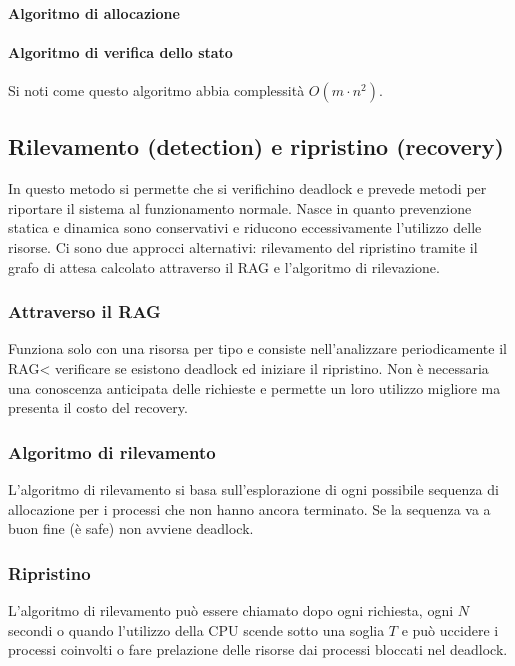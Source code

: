 \paragraph{Algoritmo di allocazione}

\paragraph{Algoritmo di verifica dello stato}

Si noti come questo algoritmo abbia complessit\`a $O(m\cdot n^2)$.
\subsection{Rilevamento (detection) e ripristino (recovery)}
In questo metodo si permette che si verifichino deadlock e prevede metodi per riportare il sistema al funzionamento normale. Nasce in quanto prevenzione statica e dinamica sono 
conservativi e riducono eccessivamente l'utilizzo delle risorse. Ci sono due approcci alternativi: rilevamento del ripristino tramite il grafo di attesa calcolato attraverso il RAG
e l'algoritmo di rilevazione.
\subsubsection{Attraverso il RAG}
Funziona solo con una risorsa per tipo e consiste nell'analizzare periodicamente il RAG< verificare se esistono deadlock ed iniziare il ripristino. Non \`e necessaria una conoscenza
anticipata delle richieste e permette un loro utilizzo migliore ma presenta il costo del recovery. 
\subsubsection{Algoritmo di rilevamento}
L'algoritmo di rilevamento si basa sull'esplorazione di ogni possibile sequenza di allocazione per i processi che non hanno ancora terminato. Se la sequenza va a buon fine (\`e safe)
non avviene deadlock.


\subsubsection{Ripristino}
L'algoritmo di rilevamento pu\`o essere chiamato dopo ogni richiesta, ogni $N$ secondi o quando l'utilizzo della CPU scende sotto una soglia $T$ e pu\`o uccidere i processi coinvolti o 
fare prelazione delle risorse dai processi bloccati nel deadlock. 
